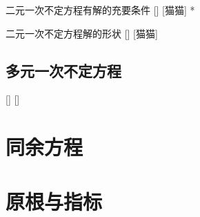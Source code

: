 \documentclass[UTF8]{ctexart}
\begin{document}
            \begin{thm}
                []
                {二元一次不定方程有解的充要条件}
                []
                [猫猫]
                *
            \end{thm}
            
            \begin{thm}
                []
                {二元一次不定方程解的形状}
                []
                [猫猫]
            \end{thm}

        \subsection{多元一次不定方程}
            
            \begin{thm}
                []
                {}
                []
                []
            \end{thm}

    

    \section{同余方程}

    \section{原根与指标}
        
        
\end{document}
